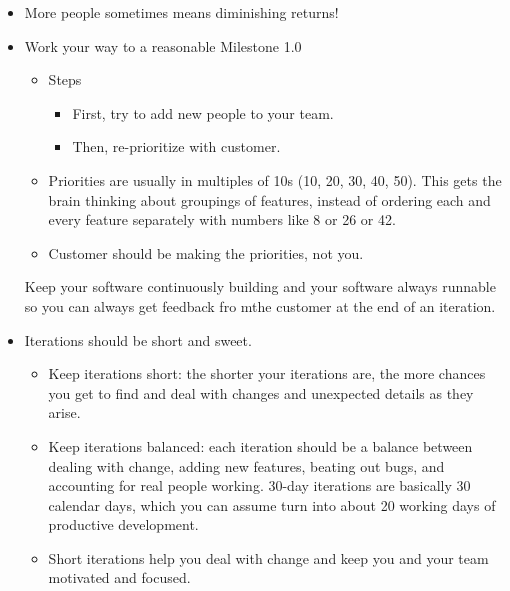\documentclass[letterpaper]{article}
\begin{document}
\begin{itemize}
    \item More people sometimes means diminishing returns! 
    
    \item Work your way to a reasonable Milestone 1.0 
    \begin{itemize}
        \item Steps 
        \begin{itemize}
            \item First, try to add new people to your team.
            \item Then, re-prioritize with customer.  
        \end{itemize}

        \item Priorities are usually in multiples of 10s (10, 20, 30, 40, 50). This gets the brain thinking about groupings of features, instead of ordering each and every feature separately with numbers like 8 or 26 or 42. 
        \item Customer should be making the priorities, not you. 
    \end{itemize}

    \begin{mdframed}
        Keep your software continuously building and your software always runnable so you can always get feedback fro mthe customer at the end of an iteration.     
    \end{mdframed}

    \item Iterations should be short and sweet. 
    \begin{itemize}
        \item Keep iterations short: the shorter your iterations are, the more chances you get to find and deal with changes and unexpected details as they arise. 
        \item Keep iterations balanced: each iteration should be a balance between dealing with change, adding new features, beating out bugs, and accounting for real people working. 30-day iterations are basically 30 calendar days, which you can assume turn into about 20 working days of productive development.
        \item Short iterations help you deal with change and keep you and your team motivated and focused. 
    \end{itemize}


\end{itemize}
\end{document}
